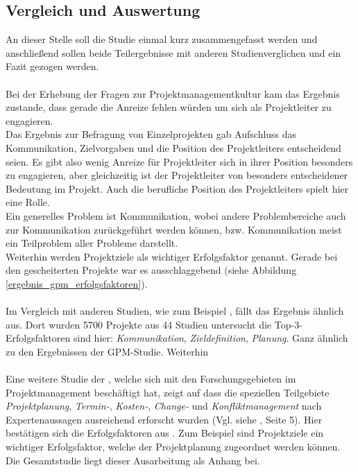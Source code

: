 \documentclass[12pt]{scrartcl}
\begin{document}
\subsection{Vergleich und Auswertung}
An dieser Stelle soll die Studie einmal kurz zusammengefasst werden und anschließend sollen beide Teilergebnisse mit anderen Studienverglichen und ein Fazit gezogen werden. \\
\\
Bei der Erhebung der Fragen zur Projektmanagementkultur kam das Ergebnis zustande, dass gerade die Anreize fehlen würden um sich als Projektleiter zu engagieren. \\
Das Ergebnis zur Befragung von Einzelprojekten gab Aufschluss das Kommunikation, Zielvorgaben und die Position des Projektleiters entscheidend seien. Es gibt also wenig Anreize für Projektleiter sich in ihrer Position besonders zu engagieren, aber gleichzeitig ist der Projektleiter von besonders entscheidener Bedeutung im Projekt. Auch die berufliche  Position des Projektleiters spielt hier eine Rolle.\\
Ein generelles Problem ist Kommunikation, wobei andere Problembereiche auch zur Kommunikation zurückgeführt werden können, bzw. Kommunikation meist ein Teilproblem aller Probleme darstellt.\\
Weiterhin werden Projektziele als wichtiger Erfolgsfaktor genannt. Gerade bei den gescheiterten Projekte war es ausschlaggebend (siehe Abbildung \ref{ergebnis_gpm_erfolgsfaktoren}).\\
\\
Im Vergleich mit anderen Studien, wie zum Beispiel \cite{euregio__studie_erfolgsfaktoren}, fällt das Ergebnis ähnlich aus. Dort wurden 5700 Projekte aus 44 Studien untersucht die Top-3-Erfolgsfaktoren sind hier: \textit{Kommunikation}, \textit{Zieldefinition}, \textit{Planung}. Ganz ähnlich zu den Ergebnissen der GPM-Studie. Weiterhin \\
\\
Eine weitere Studie der \cite{gpm_gesamt_07_09}, welche sich mit den Forschungsgebieten im Projektmanagement beschäftigt hat, zeigt auf dass die speziellen Teilgebiete \textit{Projektplanung}, \textit{Termin-}, \textit{Kosten-}, \textit{Change-} und \textit{Konfliktmanagement} nach Expertenaussagen ausreichend erforscht wurden (Vgl. siehe \cite{gpm_gesamt_07_09}, Seite 5). Hier bestätigen sich die Erfolgsfaktoren aus \cite{GPM_Studie_2008}. Zum Beispiel sind Projektziele ein wichtiger Erfolgsfaktor, welche der Projektplanung zugeordnet werden können. Die Gesamtstudie liegt dieser Ausarbeitung als Anhang bei. \\
\end{document}
